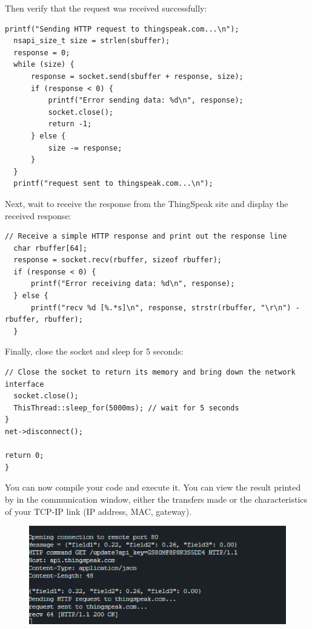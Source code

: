 \documentclass[10pt,a4paper,onecolumn]{article}
\let\textttOrig=\texttt
\def\texttt#1{\expandafter\textttOrig{\seqsplit{#1}}}
\begin{document}
Then verify that the request was received successfully:

\begin{lstlisting}[style=CStyle]
  printf("Sending HTTP request to thingspeak.com...\n");
  nsapi_size_t size = strlen(sbuffer);
  response = 0;
  while (size) {
      response = socket.send(sbuffer + response, size);
      if (response < 0) {
          printf("Error sending data: %d\n", response);
          socket.close();
          return -1;
      } else {
          size -= response;
      }
  }
  printf("request sent to thingspeak.com...\n");
\end{lstlisting}

Next, wait to receive the response from the ThingSpeak site and display the received response:

\begin{lstlisting}[style=CStyle]
  // Receive a simple HTTP response and print out the response line
  char rbuffer[64];
  response = socket.recv(rbuffer, sizeof rbuffer);
  if (response < 0) {
      printf("Error receiving data: %d\n", response);
  } else {
      printf("recv %d [%.*s]\n", response, strstr(rbuffer, "\r\n") - rbuffer, rbuffer);
  }
\end{lstlisting}

Finally, close the socket and sleep for 5 seconds:

\begin{lstlisting}[style=CStyle]
  // Close the socket to return its memory and bring down the network interface
  socket.close();
  ThisThread::sleep_for(5000ms); // wait for 5 seconds
}
net->disconnect();

return 0;
}
\end{lstlisting}

You can now compile your code and execute it. You can view the result
printed by \texttt{printf} in the communication window, either the
transfers made or the characteristics of your TCP-IP link (IP address,
MAC, gateway).

\begin{figure}[H]
  \begin{center}
    \includegraphics[width=\dimexpr\textwidth-1cm\relax,height=\dimexpr0.25\textheight-3cm\relax,keepaspectratio]{images/28.png}
  \end{center}
\end{figure}
\end{document}
